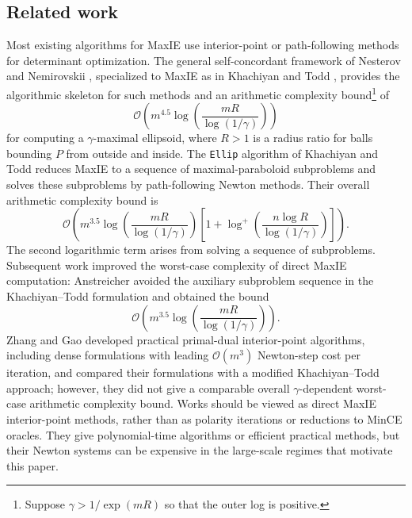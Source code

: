 \documentclass[smallextended]{svjour3}
\begin{document}
\subsection{Related work}
Most existing algorithms for MaxIE use interior-point or path-following methods
for determinant optimization. The general self-concordant framework of
Nesterov and Nemirovskii \cite{nesterov1994interior}, specialized to MaxIE as in
Khachiyan and Todd \cite{khachiyan1990complexity}, provides the algorithmic
skeleton for such methods and an arithmetic complexity bound\footnote{Suppose $\gamma > 1/\exp(mR)$ so that the outer log is positive.} of
\[
    \mathcal{O}\left(
        m^{4.5}\log\left(
        \frac{mR}{\log(1/\gamma)}\right)
    \right) 
\]
for computing a $\gamma$-maximal ellipsoid, 
where $R> 1$ is a radius ratio for balls bounding $P$ from outside and inside.
The \texttt{Ellip} algorithm of Khachiyan and Todd \cite{khachiyan1990complexity} reduces MaxIE to a sequence of maximal-paraboloid subproblems and
solves these subproblems by path-following Newton methods.
Their overall arithmetic complexity bound is
\[
    \mathcal{O}\left(
        m^{3.5}\log\left(
        \frac{mR}{\log(1/\gamma)}\right)
        \left[1+\log^+\!\left(
        \frac{n\log R}{\log(1/\gamma)}\right)\right]
    \right).
\]
The second logarithmic term arises from solving a sequence of subproblems.
Subsequent work improved the worst-case complexity of direct MaxIE computation:
Anstreicher \cite{anstreicher2002improved} avoided the auxiliary subproblem
sequence in the Khachiyan--Todd formulation and obtained the bound
\[
    \mathcal{O}\left(
        m^{3.5}\log\left(
        \frac{mR}{\log(1/\gamma)}\right)
    \right).
\]
Zhang and Gao \cite{zhanggao2003mvie} developed practical primal-dual
interior-point algorithms, including dense formulations with leading
$\mathcal{O}(m^3)$ Newton-step cost per iteration, and compared their formulations
with a modified Khachiyan--Todd approach; however, they did not give a comparable
overall $\gamma$-dependent worst-case arithmetic complexity bound. Works
\cite{anstreicher2002improved,zhanggao2003mvie}
should be viewed as direct MaxIE
interior-point methods, rather than as polarity iterations or reductions to
MinCE oracles. They give polynomial-time algorithms or efficient practical
methods, but their Newton systems can be expensive in the large-scale regimes
that motivate this paper.
\end{document}
